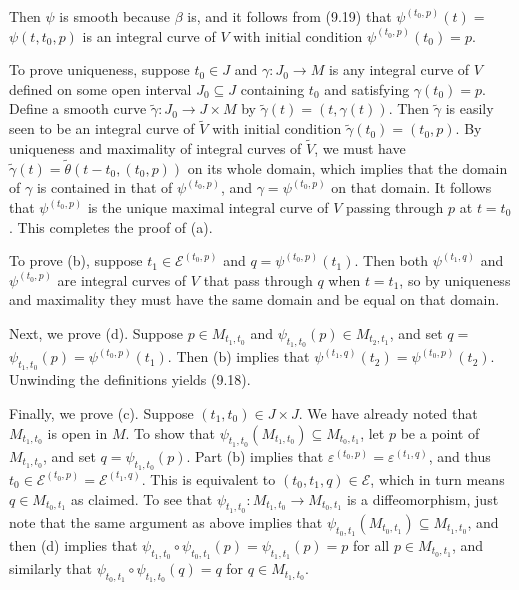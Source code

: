 \documentclass[10pt]{article}
\begin{document}
Then $\psi$ is smooth because $\beta$ is, and it follows from (9.19) that $\psi^{\left(t_{0}, p\right)}(t)=$ $\psi\left(t, t_{0}, p\right)$ is an integral curve of $V$ with initial condition $\psi^{\left(t_{0}, p\right)}\left(t_{0}\right)=p$.

To prove uniqueness, suppose $t_{0} \in J$ and $\gamma: J_{0} \rightarrow M$ is any integral curve of $V$ defined on some open interval $J_{0} \subseteq J$ containing $t_{0}$ and satisfying $\gamma\left(t_{0}\right)=p$. Define a smooth curve $\tilde{\gamma}: J_{0} \rightarrow J \times M$ by $\tilde{\gamma}(t)=(t, \gamma(t))$. Then $\tilde{\gamma}$ is easily seen to be an integral curve of $\widetilde{V}$ with initial condition $\widetilde{\gamma}\left(t_{0}\right)=\left(t_{0}, p\right)$. By uniqueness and maximality of integral curves of $\widetilde{V}$, we must have $\widetilde{\gamma}(t)=\widetilde{\theta}\left(t-t_{0},\left(t_{0}, p\right)\right)$ on its whole domain, which implies that the domain of $\gamma$ is contained in that of $\psi^{\left(t_{0}, p\right)}$, and $\gamma=\psi^{\left(t_{0}, p\right)}$ on that domain. It follows that $\psi^{\left(t_{0}, p\right)}$ is the unique maximal integral curve of $V$ passing through $p$ at $t=t_{0}$. This completes the proof of (a).

To prove (b), suppose $t_{1} \in \mathcal{E}^{\left(t_{0}, p\right)}$ and $q=\psi^{\left(t_{0}, p\right)}\left(t_{1}\right)$. Then both $\psi^{\left(t_{1}, q\right)}$ and $\psi^{\left(t_{0}, p\right)}$ are integral curves of $V$ that pass through $q$ when $t=t_{1}$, so by uniqueness and maximality they must have the same domain and be equal on that domain.

Next, we prove (d). Suppose $p \in M_{t_{1}, t_{0}}$ and $\psi_{t_{1}, t_{0}}(p) \in M_{t_{2}, t_{1}}$, and set $q=$ $\psi_{t_{1}, t_{0}}(p)=\psi^{\left(t_{0}, p\right)}\left(t_{1}\right)$. Then (b) implies that $\psi^{\left(t_{1}, q\right)}\left(t_{2}\right)=\psi^{\left(t_{0}, p\right)}\left(t_{2}\right)$. Unwinding the definitions yields (9.18).

Finally, we prove (c). Suppose $\left(t_{1}, t_{0}\right) \in J \times J$. We have already noted that $M_{t_{1}, t_{0}}$ is open in $M$. To show that $\psi_{t_{1}, t_{0}}\left(M_{t_{1}, t_{0}}\right) \subseteq M_{t_{0}, t_{1}}$, let $p$ be a point of $M_{t_{1}, t_{0}}$, and set $q=\psi_{t_{1}, t_{0}}(p)$. Part (b) implies that $\varepsilon^{\left(t_{0}, p\right)}=\varepsilon^{\left(t_{1}, q\right)}$, and thus $t_{0} \in \mathcal{E}^{\left(t_{0}, p\right)}=\mathcal{E}^{\left(t_{1}, q\right)}$. This is equivalent to $\left(t_{0}, t_{1}, q\right) \in \mathcal{E}$, which in turn means $q \in M_{t_{0}, t_{1}}$ as claimed. To see that $\psi_{t_{1}, t_{0}}: M_{t_{1}, t_{0}} \rightarrow M_{t_{0}, t_{1}}$ is a diffeomorphism, just note that the same argument as above implies that $\psi_{t_{0}, t_{1}}\left(M_{t_{0}, t_{1}}\right) \subseteq M_{t_{1}, t_{0}}$, and then (d) implies that $\psi_{t_{1}, t_{0}} \circ \psi_{t_{0}, t_{1}}(p)=\psi_{t_{1}, t_{1}}(p)=p$ for all $p \in M_{t_{0}, t_{1}}$, and similarly that $\psi_{t_{0}, t_{1}} \circ \psi_{t_{1}, t_{0}}(q)=q$ for $q \in M_{t_{1}, t_{0}}$.
\end{document}
